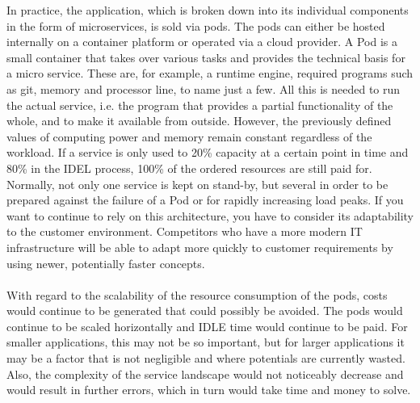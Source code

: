 \documentclass[a4paper,twoside,11pt, pagesize]{scrartcl}
\begin{document}
\begin{spacing}{1.2}
In practice, the application, which is broken down into its individual components in the form of microservices, is sold via pods. The pods can either be hosted internally on a container platform or operated via a cloud provider. A Pod is a small container that takes over various tasks and provides the technical basis for a micro service. These are, for example, a runtime engine, required programs such as git, memory and processor line, to name just a few. All this is needed to run the actual service, i.e. the program that provides a partial functionality of the whole, and to make it available from outside. However, the previously defined values of computing power and memory remain constant regardless of the workload. If a service is only used to 20\% capacity at a certain point in time and 80\% in the IDEL process, 100\% of the ordered resources are still paid for. Normally, not only one service is kept on stand-by, but several in order to be prepared against the failure of a Pod or for rapidly increasing load peaks. If you want to continue to rely on this architecture, you have to consider its adaptability to the customer environment. Competitors who have a more modern IT infrastructure will be able to adapt more quickly to customer requirements by using newer, potentially faster concepts. \\\\
With regard to the scalability of the resource consumption of the pods, costs would continue to be generated that could possibly be avoided. The pods would continue to be scaled horizontally and IDLE time would continue to be paid. For smaller applications, this may not be so important, but for larger applications it may be a factor that is not negligible and where potentials are currently wasted. Also, the complexity of the service landscape would not noticeably decrease and would result in further errors, which in turn would take time and money to solve.  


\end{spacing}
\end{document}
